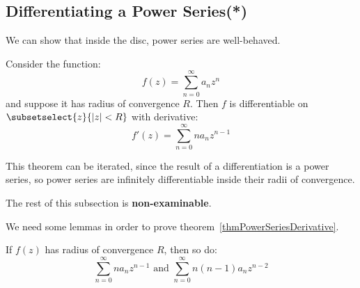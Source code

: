 \documentclass[../Main.tex]{subfiles}
\begin{document}
\subsection{Differentiating a Power Series(*)}
We can show that inside the disc, power series are well-behaved.
\begin{theorem}
    Consider the function:
    \begin{equation*}
        f(z) = \sum_{n = 0}^\infty a_n z^n
    \end{equation*}
    and suppose it has radius of convergence $R$. Then $f$ is differentiable on $\subsetselect{z}{|z| < R}$ with derivative:
    \begin{equation*}
        f'(z) = \sum_{n = 0}^\infty n a_n z^{n-1}
    \end{equation*}
    \label{thmPowerSeriesDerivative}
\end{theorem}
\begin{remark}
    This theorem can be iterated, since the result of a differentiation is a power series, so power series are infinitely differentiable inside their radii of convergence.
\end{remark}
The rest of this subsection is \textbf{non-examinable}.\par
We need some lemmas in order to prove theorem~\ref{thmPowerSeriesDerivative}.
\begin{lemma}
    If $f(z)$ has radius of convergence $R$, then so do:
    \begin{equation*}
        \sum_{n = 0}^\infty n a_n z^{n-1} \text{ and } \sum_{n = 0}^\infty n(n-1) a_n z^{n-2}
    \end{equation*}
    \label{lemPowerSeriesDerivativesConverge}
\end{lemma}
\end{document}
